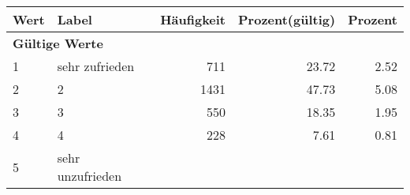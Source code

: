     \begin{longtable}{lXrrr}
     \toprule
     \textbf{Wert} & \textbf{Label} & \textbf{Häufigkeit} & \textbf{Prozent(gültig)} & \textbf{Prozent} \\
     \endhead
     \midrule
     \multicolumn{5}{l}{\textbf{Gültige Werte}}\\

     1 &
     \multicolumn{1}{X}{ sehr zufrieden   } &


       \num{711} &
       \num[round-mode=places,round-precision=2]{23,72} &
         \num[round-mode=places,round-precision=2]{2,52} \\

     2 &
     \multicolumn{1}{X}{ 2   } &


       \num{1431} &
       \num[round-mode=places,round-precision=2]{47,73} &
         \num[round-mode=places,round-precision=2]{5,08} \\

     3 &
     \multicolumn{1}{X}{ 3   } &


       \num{550} &
       \num[round-mode=places,round-precision=2]{18,35} &
         \num[round-mode=places,round-precision=2]{1,95} \\

     4 &
     \multicolumn{1}{X}{ 4   } &


       \num{228} &
       \num[round-mode=places,round-precision=2]{7,61} &
         \num[round-mode=places,round-precision=2]{0,81} \\

     5 &
     \multicolumn{1}{X}{ sehr unzufrieden   } &



\end{longtable}
